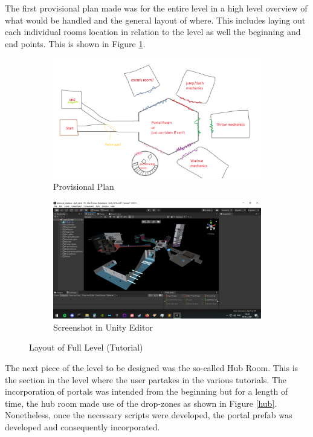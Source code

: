 \\\\
The first provisional plan made was for the entire level in a high level overview of what would be handled and the general layout of where. This includes laying out each individual rooms location in relation to the level as well the beginning and end points. This is shown in Figure \ref{full}.
\begin{figure}[H]
\centering
\begin{subfigure}{0.45\textwidth}
  \centering
  \includegraphics[width=1\linewidth]{Figures/fullplan.png}
  \caption{Provisional Plan}
\end{subfigure}%
\begin{subfigure}{0.45\textwidth}
  \centering
  \includegraphics[width=1\linewidth]{Figures/full.png}
  \caption{Screenshot in Unity Editor}
\end{subfigure}
\caption{Layout of Full Level (Tutorial)}
\label{full}
\end{figure}

\noindent The next piece of the level to be designed was the so-called Hub Room. This is the section in the level where the user partakes in the various tutorials. The incorporation of portals was intended from the beginning but for a length of time, the hub room made use of the drop-zones as shown in Figure \ref{hub}. Nonetheless, once the necessary scripts were developed, the portal prefab was developed and consequently incorporated. 

